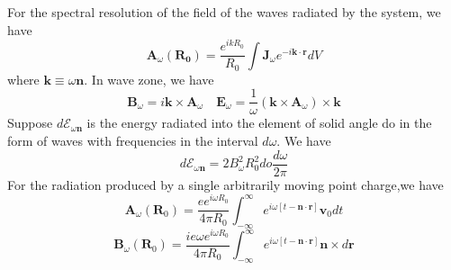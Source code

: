 For the spectral resolution of the field of the waves radiated by the system, we have
\[\bm{A}_{\omega}(\bm{R_0}) =  \frac{e^{ikR_0}}{R_0} \int \bm{J}_{\omega} e^{-i\bm{k}\cdot\bm{r}} dV\]
where $\bm{k} \equiv \omega\bm{n}$.
In wave zone, we have
\[\bm{B}_{\omega} = i\bm{k} \times \bm{A}_{\omega} \quad \bm{E}_{\omega} = \frac{1}{\omega} \left( \bm{k} \times \bm{A}_{\omega}\right) \times \bm{k}\]
Suppose $d\mathcal{E}_{\omega\bm{n}}$ is the energy radiated into the element of solid angle do in the form of waves with frequencies in the interval $d\omega$. We have
\[d\mathcal{E}_{\omega\bm{n}} = 2B_{\omega}^2 R_0^2 do \frac{d\omega}{2\pi}\]
For the radiation produced by a single arbitrarily moving point charge,we have
\[\bm{A}_{\omega}(\bm{R}_0) = \frac{e e^{i\omega
R_0}}{4\pi R_0}  \int_{-\infty}^{\infty} e^{i\omega[
t-\bm{n}\cdot\bm{r}]} \bm{v}_0 dt\]
\[\bm{B}_{\omega}(\bm{R}_0) = \frac{ie\omega e^{i\omega
R_0}}{4\pi R_0}  \int_{-\infty}^{\infty} e^{i\omega[
t-\bm{n}\cdot\bm{r}]}  \bm{n} \times d\bm{r}\]


